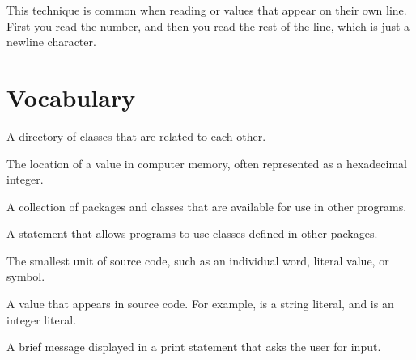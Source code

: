 This technique is common when reading  or  values that appear on their own line.
First you read the number, and then you read the rest of the line, which is just a newline character.



\section{Vocabulary}

\begin{description}

A directory of classes that are related to each other.

The location of a value in computer memory, often represented as a hexadecimal integer.

A collection of packages and classes that are available for use in other programs.





A statement that allows programs to use classes defined in other packages.

The smallest unit of source code, such as an individual word, literal value, or symbol.



A value that appears in source code.
For example,  is a string literal, and  is an integer literal.

A brief message displayed in a print statement that asks the user for input.


\end{description}
